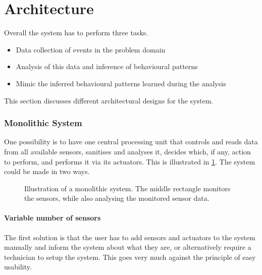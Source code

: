 
\section{Architecture}\label{sec:architecture}

Overall the system has to perform three tasks.

\begin{itemize}
\item Data collection of events in the problem domain
\item Analysis of this data and inference of behavioural patterns
\item Mimic the inferred behavioural patterns learned during the analysis
\end{itemize}
This section discusses different architectural designs for the system. 

\subsubsection{Monolithic System} 
One possibility is to have one central processing unit that controls and reads data  from all available sensors, sanitises and analyses it, decides which, if any, action to perform, and performs it via its actuators. This is illustrated in \cref{fig:monolithic_system}. The system could be made in two ways.

\begin{figure}[htbp]
\centering
{}
\caption{Illustration of a monolithic system. The middle rectangle monitors the sensors, while also analysing the monitored sensor data.}\label{fig:monolithic_system}
\end{figure}

\paragraph{Variable number of sensors}
The first solution is that the user has to add sensors and actuators to the system manually and inform the system about what they are, or alternatively require a technician to setup the system. This goes very much against the principle of easy usability. 

